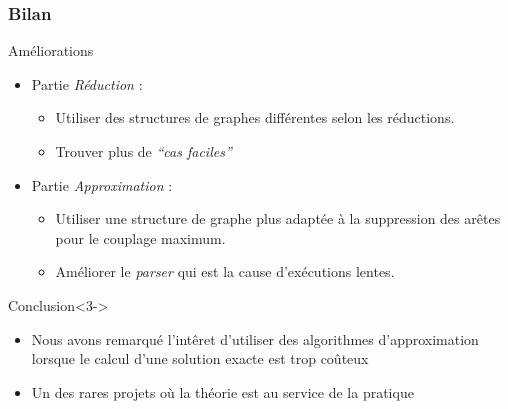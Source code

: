 \begin{frame}
 \frametitle{Bilan}

 \begin{block}{Améliorations}
  \begin{itemize}
   \item Partie \emph{Réduction} : 
	 \begin{itemize}
	  \item Utiliser des structures de graphes différentes selon les
		réductions.
	  \item Trouver plus de \emph{``cas faciles''}
	 \end{itemize}
   \item<2-> Partie \emph{Approximation} :
	 \begin{itemize}
	  \item Utiliser une structure de graphe plus adaptée à la
		suppression des arêtes pour le couplage maximum.
	  \item Améliorer le \emph{parser} qui est la cause d'exécutions
		lentes.
	 \end{itemize}
  \end{itemize}
 \end{block}

 \begin{block}{Conclusion}<3->
  \begin{itemize}
   \item Nous avons remarqué l'intêret d'utiliser des algorithmes
	 d'approximation lorsque le calcul d'une solution exacte est
	 trop coûteux
   \item Un des rares projets où la théorie est au service de la
	 pratique
  \end{itemize}
 \end{block}
\end{frame}